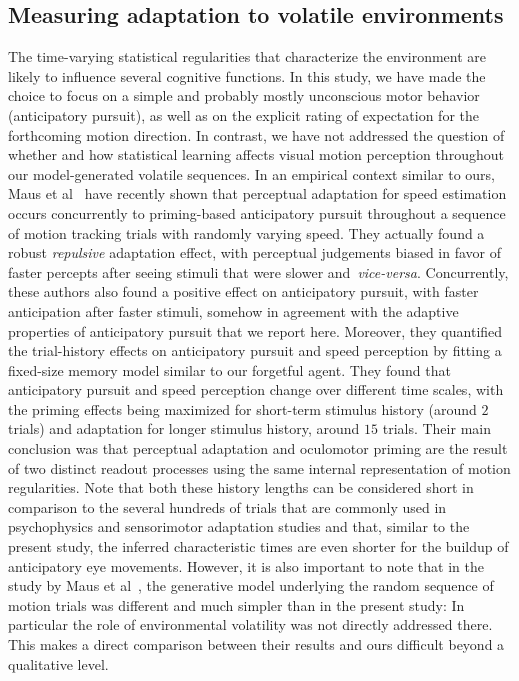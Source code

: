\documentclass[10pt,letterpaper]{article}
\newcommand{\citet}[1]{\cite{#1}}
\begin{document}
\subsection{Measuring adaptation to volatile environments}
The time-varying statistical regularities that characterize the environment are likely to influence several cognitive functions. In this study, we have made the choice to focus on a simple and probably mostly unconscious motor behavior (anticipatory pursuit), as well as on the explicit rating of expectation for the forthcoming motion direction. In contrast, we have not addressed the question of whether and how statistical learning affects visual motion perception throughout our model-generated volatile sequences. In an empirical context similar to ours, Maus et al~\citet{Maus2015} have recently shown that perceptual adaptation for speed estimation occurs concurrently to priming-based anticipatory pursuit throughout a sequence of motion tracking trials with randomly varying speed. They actually found a robust \emph{repulsive} adaptation effect, with perceptual judgements biased in favor of faster percepts after seeing stimuli that were slower and~\textit{vice-versa}. Concurrently, these authors also found a positive effect on anticipatory pursuit, with faster anticipation after faster stimuli, somehow in agreement with the adaptive properties of anticipatory pursuit that we report here. Moreover, they quantified the trial-history effects on anticipatory pursuit and speed perception by fitting a fixed-size memory model similar to our forgetful agent. They found that anticipatory pursuit and speed perception change over different time scales, with the priming effects being maximized for short-term stimulus history (around $2$ trials) and adaptation for longer stimulus history, around $15$ trials. Their main conclusion was that perceptual adaptation and oculomotor priming are the result of two distinct readout processes using the same internal representation of motion regularities. Note that both these history lengths can be considered short in comparison to the several hundreds of trials that are commonly used in psychophysics and sensorimotor adaptation studies and that, similar to the present study, the inferred characteristic times are even shorter for the buildup of anticipatory eye movements. However, it is also important to note that in the study by Maus et al~\citet{Maus2015}, the generative model underlying the random sequence of motion trials was different and much simpler than in the present study: In particular the role of environmental volatility was not directly addressed there. This makes a direct comparison between their results and ours difficult beyond a qualitative level.
\end{document}
